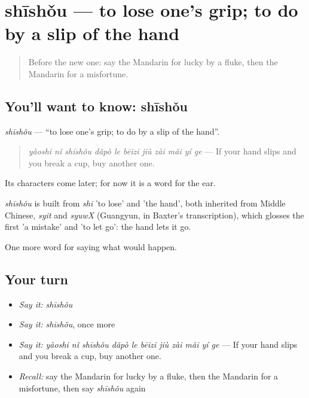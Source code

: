 \section[shīshǒu]{shīshǒu — to lose one's grip; to do by a slip of the hand}

\label{lesson:ZH-C531-shishou}



\begin{quote}
Before the new one: say the Mandarin for lucky by a fluke, then the Mandarin for a misfortune.
\end{quote}

\subsection*{You'll want to know: shīshǒu}
\emph{shīshǒu} — \textquotedblleft{}to lose one's grip; to do by a slip of the hand\textquotedblright{}.

\begin{quote}
\emph{yàoshi nǐ shīshǒu dǎpò le bēizi jiù zài mǎi yí ge} — If your hand slips and you break a cup, buy another one.
\end{quote}

Its characters come later; for now it is a word for the ear.

\begin{cousinweb}
\emph{shīshǒu} is built from \emph{shī} 'to lose' and  'the hand', both inherited from Middle Chinese, \emph{syit} and \emph{syuwX} (Guangyun, in Baxter's transcription), which glosses the first 'a mistake' and 'to let go': the hand lets it go.
\end{cousinweb}

\begin{grammarlens}[title={What you've built}]
One more word for saying what would happen.
\end{grammarlens}

\subsection*{Your turn}
\begin{itemize}
\raggedright
  \item \emph{Say it:} \emph{shīshǒu}
  \item \emph{Say it:} \emph{shīshǒu}, once more
  \item \emph{Say it:} \emph{yàoshi nǐ shīshǒu dǎpò le bēizi jiù zài mǎi yí ge} — If your hand slips and you break a cup, buy another one.
  \item \emph{Recall:} say the Mandarin for lucky by a fluke, then the Mandarin for a misfortune, then say \emph{shīshǒu} again
\end{itemize}

